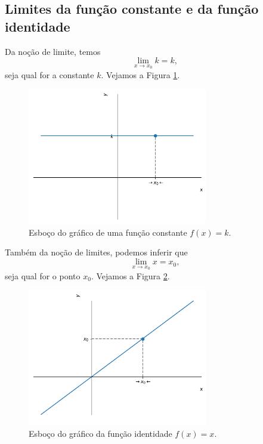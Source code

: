 \subsection{Limites da função constante e da função identidade}

Da noção de limite, temos
\begin{equation}
  \lim_{x\to x_0} k = k,
\end{equation}
seja qual for a constante $k$. Vejamos a Figura \ref{fig:lim_funk}.

\begin{figure}[H]
  \centering
  \includegraphics[width=0.7\textwidth]{./cap_lim/dados/fig_lim_funk/fig_lim_funk}
  \caption{Esboço do gráfico de uma função constante $f(x) = k$.}
  \label{fig:lim_funk}
\end{figure}

Também da noção de limites, podemos inferir que
\begin{equation}
  \lim_{x\to x_0} x = x_0,
\end{equation}
seja qual for o ponto $x_0$. Vejamos a Figura \ref{fig:lim_funid}.

\begin{figure}[H]
  \centering
  \includegraphics[width=0.7\textwidth]{./cap_lim/dados/fig_lim_funid/fig_lim_funid}
  \caption{Esboço do gráfico da função identidade $f(x) = x$.}
  \label{fig:lim_funid}
\end{figure}

